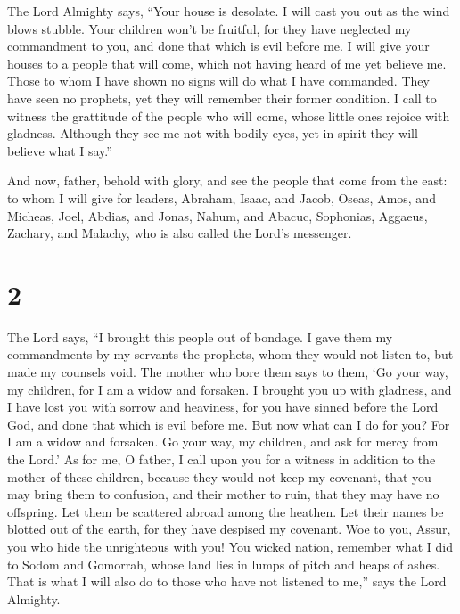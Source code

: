  The Lord Almighty says, ``Your house is desolate. I will
cast you out as the wind blows stubble.  Your children
won't be fruitful, for they have neglected my commandment to you, and
done that which is evil before me.  I will give your
houses to a people that will come, which not having heard of me yet
believe me. Those to whom I have shown no signs will do what I have
commanded.  They have seen no prophets, yet they will
remember their former condition.  I call to witness the
grattitude of the people who will come, whose little ones rejoice with
gladness. Although they see me not with bodily eyes, yet in spirit they
will believe what I say.''

 And now, father, behold with glory, and see the people
that come from the east:  to whom I will give for
leaders, Abraham, Isaac, and Jacob, Oseas, Amos, and Micheas, Joel,
Abdias, and Jonas,  Nahum, and Abacuc, Sophonias,
Aggaeus, Zachary, and Malachy, who is also called the Lord's messenger.

\hypertarget{section-1}{%
\section{2}\label{section-1}}

 The Lord says, ``I brought this people out of bondage. I
gave them my commandments by my servants the prophets, whom they would
not listen to, but made my counsels void.  The mother who
bore them says to them, `Go your way, my children, for I am a widow and
forsaken.  I brought you up with gladness, and I have lost
you with sorrow and heaviness, for you have sinned before the Lord God,
and done that which is evil before me.  But now what can I
do for you? For I am a widow and forsaken. Go your way, my children, and
ask for mercy from the Lord.'  As for me, O father, I call
upon you for a witness in addition to the mother of these children,
because they would not keep my covenant,  that you may
bring them to confusion, and their mother to ruin, that they may have no
offspring.  Let them be scattered abroad among the
heathen. Let their names be blotted out of the earth, for they have
despised my covenant.  Woe to you, Assur, you who hide the
unrighteous with you! You wicked nation, remember what I did to Sodom
and Gomorrah,  whose land lies in lumps of pitch and heaps
of ashes. That is what I will also do to those who have not listened to
me,'' says the Lord Almighty.


